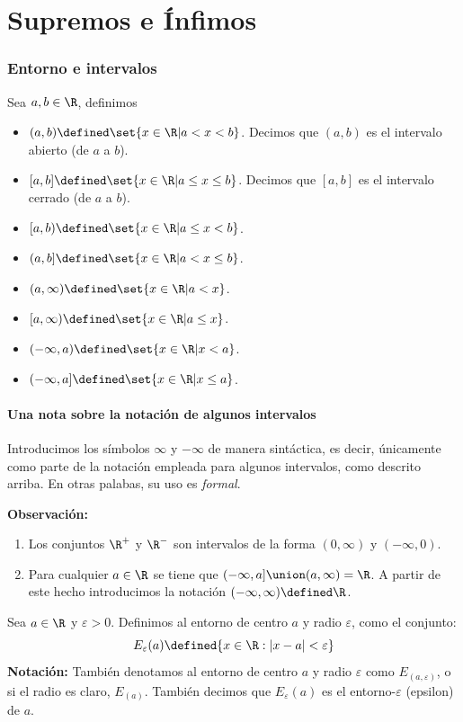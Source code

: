 \part*{Supremos e Ínfimos}

\section*{Entorno e intervalos}

  Sea $a, b\in \R$, definimos
\begin{itemize}
 \item $(a,b)\defined \set{x\in \R| a<x<b}$. Decimos que $(a,b)$ es el intervalo abierto (de $a$ a $b$).
 \item $[a,b]\defined \set{x\in \R|a\leq x\leq b}$. Decimos que $[a, b]$ es el intervalo cerrado (de $a$ a $b$).
 \item $[a,b)\defined \set{x\in \R|a\leq x <b}$.
 \item $(a,b]\defined \set{x\in \R|a<x\leq b}$.
 \item $(a, \infty)\defined \set{x\in \R | a<x}$.
 \item $[a, \infty) \defined \set{x\in \R| a\leq x}$.
 \item $(-\infty, a) \defined \set{x\in \R|x<a}$.
 \item $(-\infty, a] \defined \set{x\in \R|x\leq a}$.
\end{itemize}

\subsection*{Una nota sobre la notación de algunos intervalos}

Introducimos los símbolos $\infty$ y $-\infty$ de manera sintáctica, es decir, únicamente como parte de la notación empleada para algunos intervalos, como descrito arriba. En otras palabas, su uso es \textit{formal}.

\textbf{Observación:}
\begin{enumerate}[label=\roman*)]
  \item Los conjuntos $\R^+$ y $\R^-$ son intervalos de la forma $(0, \infty)$ y $(-\infty, 0)$.
  \item Para cualquier $a\in \R$ se tiene que $(-\infty, a]\union (a, \infty) = \R$. A partir de este hecho introducimos la notación $(-\infty, \infty) \defined \R$.
\end{enumerate}

 Sea $a \in \R$ y $\varepsilon>0$. Definimos al entorno de centro $a$ y radio $\varepsilon$, como el conjunto: \[E_\varepsilon(a)\defined \{ x\in \R: |x-a|<\varepsilon\}\]
\textbf{Notación:} También denotamos al entorno de centro $a$ y radio $\varepsilon$ como $E_{(a, \varepsilon)}$, o si el radio es claro, $E_{(a)}$. También decimos que $E_\varepsilon(a)$ es el entorno-$\varepsilon$ (epsilon) de $a$.

